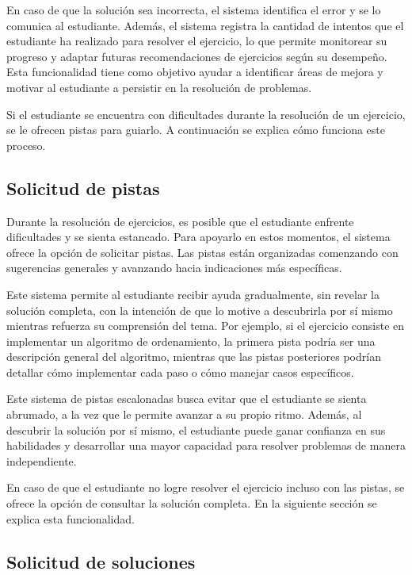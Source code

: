 En caso de que la solución sea incorrecta, el sistema identifica el error y se lo comunica al estudiante. Además, el sistema registra la cantidad de intentos que el estudiante ha realizado para resolver el ejercicio, lo que permite monitorear su progreso y adaptar futuras recomendaciones de ejercicios según su desempeño. Esta funcionalidad tiene como objetivo ayudar a identificar áreas de mejora y motivar al estudiante a persistir en la resolución de problemas.

Si el estudiante se encuentra con dificultades durante la resolución de un ejercicio, se le ofrecen pistas para guiarlo. A continuación se explica cómo funciona este proceso.

\subsection{Solicitud de pistas}

Durante la resolución de ejercicios, es posible que el estudiante enfrente dificultades y se sienta estancado. Para apoyarlo en estos momentos, el sistema ofrece la opción de solicitar pistas. Las pistas están organizadas comenzando con sugerencias generales y avanzando hacia indicaciones más específicas. 

Este sistema permite al estudiante recibir ayuda gradualmente, sin revelar la solución completa, con la intención de que lo motive a descubrirla por sí mismo mientras refuerza su comprensión del tema. Por ejemplo, si el ejercicio consiste en implementar un algoritmo de ordenamiento, la primera pista podría ser una descripción general del algoritmo, mientras que las pistas posteriores podrían detallar cómo implementar cada paso o cómo manejar casos específicos.

Este sistema de pistas escalonadas busca evitar que el estudiante se sienta abrumado, a la vez que le permite avanzar a su propio ritmo. Además, al descubrir la solución por sí mismo, el estudiante puede ganar confianza en sus habilidades y desarrollar una mayor capacidad para resolver problemas de manera independiente.

En caso de que el estudiante no logre resolver el ejercicio incluso con las pistas, se ofrece la opción de consultar la solución completa. En la siguiente sección se explica esta funcionalidad.

\subsection{Solicitud de soluciones}


